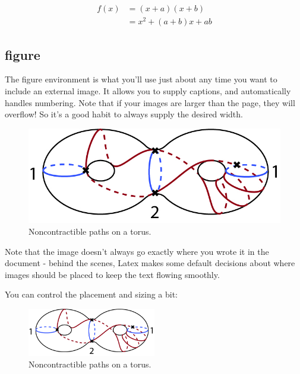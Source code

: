 \documentclass{article}
\begin{document}
        \begin{align}
         f(x) &= (x+a)(x+b) \nonumber \\
              &= x^2 + (a+b)x + ab
        \end{align}

    \subsection{figure}
        The figure environment is what you'll use just about any time you want to include an external image. It allows you to supply captions, and automatically handles numbering. Note that if your images are larger than the page, they will overflow! So it's a good habit to always supply the desired width.
        
        \begin{figure}
          \caption{Noncontractible paths on a torus.}
            \includegraphics[width=\textwidth]{ending-3} %
        \end{figure}
        
        Note that the image doesn't always go exactly where you wrote it in the document - behind the scenes, Latex makes some default decisions about where images should be placed to keep the text flowing smoothly.
        
        You can control the placement and sizing a bit:
        \begin{figure}[h] %
        \centering
          \caption{Noncontractible paths on a torus.}
            \includegraphics[width=0.5\textwidth,keepaspectratio]{ending-3}
        \end{figure}
\end{document}
